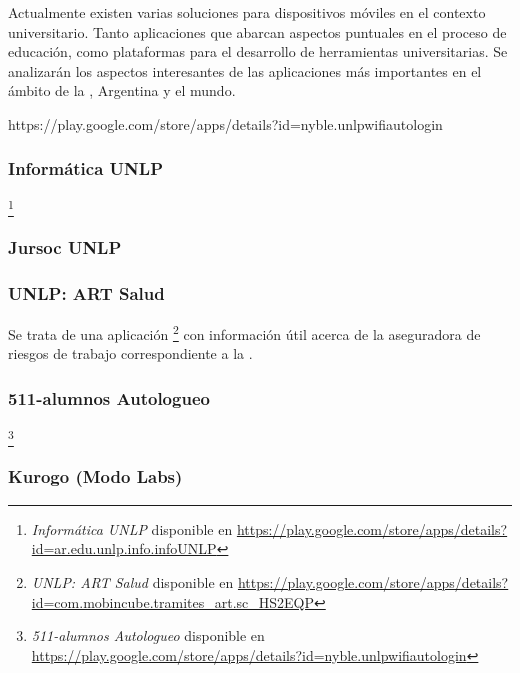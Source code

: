 Actualmente existen varias soluciones para dispositivos móviles en el contexto
universitario. Tanto aplicaciones que abarcan aspectos puntuales en el proceso
de educación, como plataformas para el desarrollo de herramientas
universitarias. Se analizarán los aspectos interesantes de las aplicaciones más
importantes en el ámbito de la \unlp, Argentina y el mundo.

https://play.google.com/store/apps/details?id=nyble.unlpwifiautologin

\subsubsection{Informática UNLP}
\label{aplicaciones_existentes_unlp_informatica_unlp}

\footnote{ \textit{Informática UNLP} disponible en \url{https://play.google.com/store/apps/details?id=ar.edu.unlp.info.infoUNLP} }

\subsubsection{Jursoc UNLP}
\label{aplicaciones_existentes_unlp_jursoc}


\subsubsection{UNLP: ART Salud}
\label{aplicaciones_existentes_unlp_art_salud}

Se trata de una aplicación \footnote{ \textit{UNLP: ART Salud} disponible en \url{https://play.google.com/store/apps/details?id=com.mobincube.tramites_art.sc_HS2EQP}} con información útil acerca de la aseguradora de riesgos de trabajo correspondiente a la \unlp. 

\subsubsection{511-alumnos Autologueo}
\label{aplicaciones_existentes_unlp_511-alumnos}

\footnote{ \textit{511-alumnos Autologueo} disponible en \url{https://play.google.com/store/apps/details?id=nyble.unlpwifiautologin} }

\subsubsection{Kurogo (Modo Labs)}
\label{aplicaciones_existentes_kurogo}


